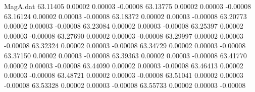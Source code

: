 \begin{filecontents}{MagA.dat}
  63.11405    0.00002    0.00003   -0.00008
  63.13775    0.00002    0.00003   -0.00008
  63.16124    0.00002    0.00003   -0.00008
  63.18372    0.00002    0.00003   -0.00008
  63.20773    0.00002    0.00003   -0.00008
  63.23084    0.00002    0.00003   -0.00008
  63.25397    0.00002    0.00003   -0.00008
  63.27690    0.00002    0.00003   -0.00008
  63.29997    0.00002    0.00003   -0.00008
  63.32324    0.00002    0.00003   -0.00008
  63.34729    0.00002    0.00003   -0.00008
  63.37150    0.00002    0.00003   -0.00008
  63.39363    0.00002    0.00003   -0.00008
  63.41770    0.00002    0.00003   -0.00008
  63.44090    0.00002    0.00003   -0.00008
  63.46413    0.00002    0.00003   -0.00008
  63.48721    0.00002    0.00003   -0.00008
  63.51041    0.00002    0.00003   -0.00008
  63.53328    0.00002    0.00003   -0.00008
  63.55733    0.00002    0.00003   -0.00008
\end{filecontents}
